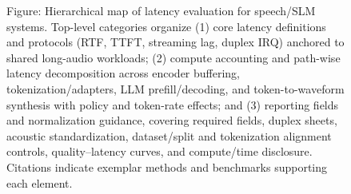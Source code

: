 \begin{figure}[h]
\caption{Figure: Hierarchical map of latency evaluation for speech/SLM systems. Top-level categories organize (1) core latency definitions and protocols (RTF, TTFT, streaming lag, duplex IRQ) anchored to shared long-audio workloads; (2) compute accounting and path-wise latency decomposition across encoder buffering, tokenization/adapters, LLM prefill/decoding, and token-to-waveform synthesis with policy and token-rate effects; and (3) reporting fields and normalization guidance, covering required fields, duplex sheets, acoustic standardization, dataset/split and tokenization alignment controls, quality–latency curves, and compute/time disclosure. Citations indicate exemplar methods and benchmarks supporting each element.}
\label{fig:tiny_tree_figure_9}

\end{figure}